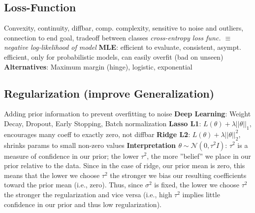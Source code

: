 \documentclass[a4paper, 11pt, landscape]{article}
\begin{document}
\begin{multicols*}{3}
\subsection{Loss-Function}
Convexity, continuity, diffbar, comp. complexity, sensitive to noise and outliers, connection to end goal, tradeoff between classes\newline
\textit{cross-entropy loss func. $\equiv$ negative log-likelihood of
model}\newline
\textbf{MLE}: efficient to evaluate, consistent, asympt. efficient, only for probabilistic models, can easily overfit (bad on unseen)\newline
\textbf{Alternatives}: Maximum margin (hinge), logistic, exponential

\subsection{Regularization (improve Generalization)}
Adding prior information to prevent overfitting to noise\newline
\textbf{Deep Learning}: Weight Decay, Dropout, Early Stopping, Batch normalization \newline
\textbf{Lasso L1}: $L(\theta)+\lambda||\theta||_1$, encourages many coeff to exactly zero, not diffbar\newline
\textbf{Ridge L2}: $L(\theta)+\lambda||\theta||_2^2$, shrinks params to small non-zero values\newline
\textbf{Interpretation $\theta\sim\mathcal{N}(0,\tau^2I)$}: $\tau^2$ is a measure of confidence in our prior; the lower $\tau^2$, the more ”belief” we
place in our prior relative to the data. Since in the case of ridge, our prior mean is zero, this means that the lower we choose $\tau^2$ the stronger we bias our resulting coefficients toward the prior mean (i.e., zero). Thus, since $\sigma^2$ is fixed, the lower we choose $\tau^2$ the stronger the regularization and vice versa (i.e., high $\tau^2$ implies little confidence in our prior and thus low regularization).

\raggedcolumns
\end{multicols*}
\end{document}
